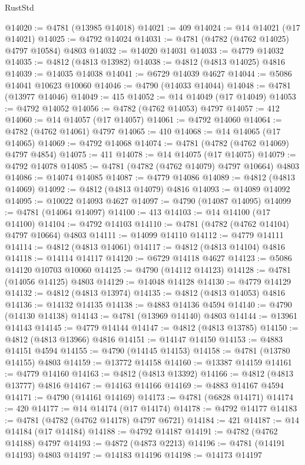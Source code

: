 \begin{lexlean}{RustStd}
\begin{coremodule}
@14020 := @4781 (@13985 @14018)
@14021 := 409
@14024 := @14 @14021 (@17 @14021)
@14025 := @4792 @14024
@14031 := @4781 (@4782 (@4762 @14025) @4797 @10584) @4803
@14032 := @14020 @14031
@14033 := @4779 @14032
@14035 := @4812 (@4813 @13982)
@14038 := @4812 (@4813 @14025) @4816
@14039 := @14035 @14038
@14041 := @6729 @14039 @4627
@14044 := @5086 @14041 @10623 @10060
@14046 := @4790 (@14033 @14044)
@14048 := @4781 (@13977 @14046)
@14049 := 415
@14052 := @14 @14049 (@17 @14049)
@14053 := @4792 @14052
@14056 := @4782 (@4762 @14053) @4797
@14057 := 412
@14060 := @14 @14057 (@17 @14057)
@14061 := @4792 @14060
@14064 := @4782 (@4762 @14061) @4797
@14065 := 410
@14068 := @14 @14065 (@17 @14065)
@14069 := @4792 @14068
@14074 := @4781 (@4782 (@4762 @14069) @4797 @4854)
@14075 := 411
@14078 := @14 @14075 (@17 @14075)
@14079 := @4792 @14078
@14085 := @4781 (@4782 (@4762 @14079) @4797 @10664) @4803
@14086 := @14074 @14085
@14087 := @4779 @14086
@14089 := @4812 (@4813 @14069)
@14092 := @4812 (@4813 @14079) @4816
@14093 := @14089 @14092
@14095 := @10022 @14093 @4627
@14097 := @4790 (@14087 @14095)
@14099 := @4781 (@14064 @14097)
@14100 := 413
@14103 := @14 @14100 (@17 @14100)
@14104 := @4792 @14103
@14110 := @4781 (@4782 (@4762 @14104) @4797 @10664) @4803
@14111 := @14099 @14110
@14112 := @4779 @14111
@14114 := @4812 (@4813 @14061)
@14117 := @4812 (@4813 @14104) @4816
@14118 := @14114 @14117
@14120 := @6729 @14118 @4627
@14123 := @5086 @14120 @10703 @10060
@14125 := @4790 (@14112 @14123)
@14128 := @4781 (@14056 @14125) @4803
@14129 := @14048 @14128
@14130 := @4779 @14129
@14132 := @4812 (@4813 @13974)
@14135 := @4812 (@4813 @14053) @4816
@14136 := @14132 @14135
@14138 := @4883 @14136 @4594
@14140 := @4790 (@14130 @14138)
@14143 := @4781 (@13969 @14140) @4803
@14144 := @13961 @14143
@14145 := @4779 @14144
@14147 := @4812 (@4813 @13785)
@14150 := @4812 (@4813 @13966) @4816
@14151 := @14147 @14150
@14153 := @4883 @14151 @4594
@14155 := @4790 (@14145 @14153)
@14158 := @4781 (@13780 @14155) @4803
@14159 := @13772 @14158
@14160 := @13387 @14159
@14161 := @4779 @14160
@14163 := @4812 (@4813 @13392)
@14166 := @4812 (@4813 @13777) @4816
@14167 := @14163 @14166
@14169 := @4883 @14167 @4594
@14171 := @4790 (@14161 @14169)
@14173 := @4781 (@6828 @14171)
@14174 := 420
@14177 := @14 @14174 (@17 @14174)
@14178 := @4792 @14177
@14183 := @4781 (@4782 (@4762 @14178) @4797 @6721)
@14184 := 421
@14187 := @14 @14184 (@17 @14184)
@14188 := @4792 @14187
@14191 := @4782 (@4762 @14188) @4797
@14193 := @4872 (@4873 @2213)
@14196 := @4781 (@14191 @14193) @4803
@14197 := @14183 @14196
@14198 := @14173 @14197

\end{coremodule}
\end{lexlean}
